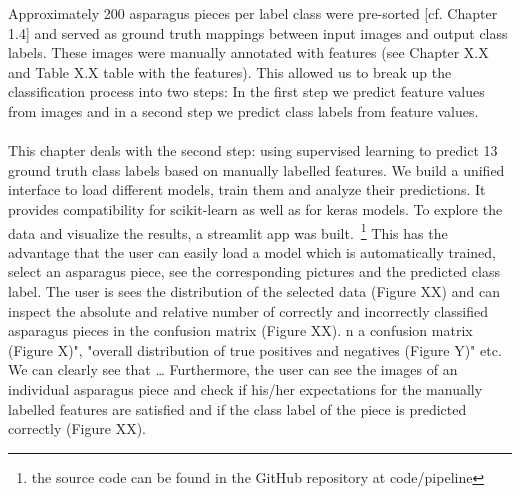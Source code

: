Approximately 200 asparagus pieces per label class were pre-sorted [cf. Chapter 1.4] and served as ground truth mappings between input images and output class labels. These images were manually annotated with features (see Chapter X.X and Table X.X table with the features). This allowed us to break up the classification process into two steps: In the first step we predict feature values from images and in a second step we predict class labels from feature values. \\
\\
This chapter deals with the second step: using supervised learning to predict 13 ground truth class labels based on manually labelled features. We build a unified interface to load different models, train them and analyze their predictions. It provides compatibility for scikit-learn as well as for keras models. To explore the data and visualize the results, a streamlit app was built.~\footnote{the source code can be found in the GitHub repository at code/pipeline} This has the advantage that the user can easily load a model which is automatically trained, select an asparagus piece, see the corresponding pictures and the predicted class label. The user is sees the distribution of the selected data (Figure XX) and can inspect the absolute and relative number of correctly and incorrectly classified asparagus pieces in the confusion matrix (Figure XX). n a confusion matrix (Figure X)", "overall distribution of true positives and negatives (Figure Y)" etc. We can clearly see that … Furthermore, the user can see the images of an individual asparagus piece and check if  his/her expectations for the manually labelled features are satisfied and if the class label of the piece is predicted correctly (Figure XX). \\

